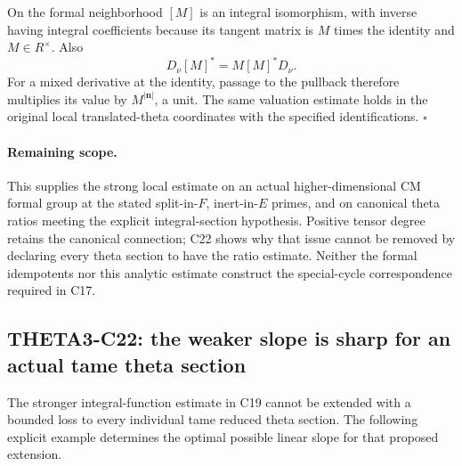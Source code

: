 \documentclass[11pt]{article}
\theoremstyle{definition}\newtheorem{definition}[theorem]{Definition}\newtheorem{remark}[theorem]{Remark}
\begin{document}
On the formal neighborhood $[M]$ is an integral isomorphism,
with inverse having integral coefficients because its tangent
matrix is $M$ times the identity and $M\in R^\times$.
Also
\[
 D_\nu[M]^*=M[M]^*D_\nu.
\]
For a mixed derivative at the identity, passage to the
pullback therefore multiplies its value by
$M^{|\mathbf n|}$, a unit.  The same valuation estimate
holds in the original local translated-theta coordinates
with the specified identifications. \hfill$\square$

\paragraph{Remaining scope.}
This supplies the strong local estimate on an actual
higher-dimensional CM formal group at the stated split-in-$F$,
inert-in-$E$ primes, and on canonical theta ratios meeting
the explicit integral-section hypothesis.  Positive tensor
degree retains the canonical connection; C22 shows why
that issue cannot be removed by declaring every theta
section to have the ratio estimate.  Neither the formal
idempotents nor this analytic estimate construct the
special-cycle correspondence required in C17.


\subsection{THETA3-C22: the weaker slope is sharp for an actual tame theta section}\label{C22}

The stronger integral-function estimate in C19 cannot be extended
with a bounded loss to every individual tame reduced theta section.
The following explicit example determines the optimal possible
linear slope for that proposed extension.
\end{document}
